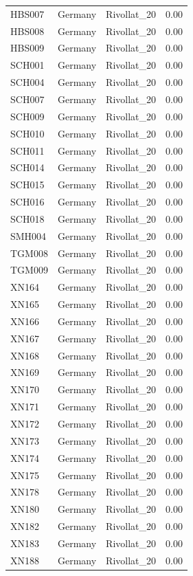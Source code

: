 \begin{longtable}[t]{lllr}
HBS007 & Germany & Rivollat\_20 & 0.00\\
HBS008 & Germany & Rivollat\_20 & 0.00\\
HBS009 & Germany & Rivollat\_20 & 0.00\\
SCH001 & Germany & Rivollat\_20 & 0.00\\
SCH004 & Germany & Rivollat\_20 & 0.00\\
SCH007 & Germany & Rivollat\_20 & 0.00\\
SCH009 & Germany & Rivollat\_20 & 0.00\\
SCH010 & Germany & Rivollat\_20 & 0.00\\
SCH011 & Germany & Rivollat\_20 & 0.00\\
SCH014 & Germany & Rivollat\_20 & 0.00\\
SCH015 & Germany & Rivollat\_20 & 0.00\\
SCH016 & Germany & Rivollat\_20 & 0.00\\
SCH018 & Germany & Rivollat\_20 & 0.00\\
SMH004 & Germany & Rivollat\_20 & 0.00\\
TGM008 & Germany & Rivollat\_20 & 0.00\\
TGM009 & Germany & Rivollat\_20 & 0.00\\
XN164 & Germany & Rivollat\_20 & 0.00\\
XN165 & Germany & Rivollat\_20 & 0.00\\
XN166 & Germany & Rivollat\_20 & 0.00\\
XN167 & Germany & Rivollat\_20 & 0.00\\
XN168 & Germany & Rivollat\_20 & 0.00\\
XN169 & Germany & Rivollat\_20 & 0.00\\
XN170 & Germany & Rivollat\_20 & 0.00\\
XN171 & Germany & Rivollat\_20 & 0.00\\
XN172 & Germany & Rivollat\_20 & 0.00\\
XN173 & Germany & Rivollat\_20 & 0.00\\
XN174 & Germany & Rivollat\_20 & 0.00\\
XN175 & Germany & Rivollat\_20 & 0.00\\
XN178 & Germany & Rivollat\_20 & 0.00\\
XN180 & Germany & Rivollat\_20 & 0.00\\
XN182 & Germany & Rivollat\_20 & 0.00\\
XN183 & Germany & Rivollat\_20 & 0.00\\
XN188 & Germany & Rivollat\_20 & 0.00\\

\end{longtable}
